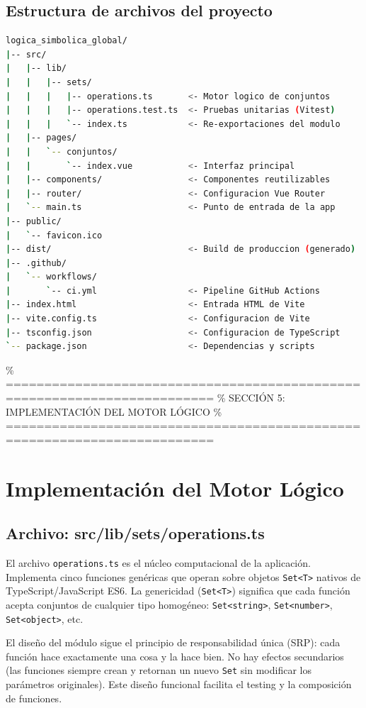 \documentclass[11pt,a4paper]{article}
\begin{document}
\subsection{Estructura de archivos del proyecto}
\begin{lstlisting}[language=bash]
logica_simbolica_global/
|-- src/
|   |-- lib/
|   |   |-- sets/
|   |   |   |-- operations.ts       <- Motor logico de conjuntos
|   |   |   |-- operations.test.ts  <- Pruebas unitarias (Vitest)
|   |   |   `-- index.ts            <- Re-exportaciones del modulo
|   |-- pages/
|   |   `-- conjuntos/
|   |       `-- index.vue           <- Interfaz principal
|   |-- components/                 <- Componentes reutilizables
|   |-- router/                     <- Configuracion Vue Router
|   `-- main.ts                     <- Punto de entrada de la app
|-- public/
|   `-- favicon.ico
|-- dist/                           <- Build de produccion (generado)
|-- .github/
|   `-- workflows/
|       `-- ci.yml                  <- Pipeline GitHub Actions
|-- index.html                      <- Entrada HTML de Vite
|-- vite.config.ts                  <- Configuracion de Vite
|-- tsconfig.json                   <- Configuracion de TypeScript
`-- package.json                    <- Dependencias y scripts
\end{lstlisting}

\newpage

\% =========================================================================
\% SECCIÓN 5: IMPLEMENTACIÓN DEL MOTOR LÓGICO
\% =========================================================================
\section{Implementación del Motor Lógico}

\subsection{Archivo: src/lib/sets/operations.ts}
El archivo \texttt{operations.ts} es el núcleo computacional de la aplicación. Implementa cinco funciones genéricas que operan sobre objetos \texttt{Set<T>} nativos de TypeScript/JavaScript ES6. La genericidad (\texttt{Set<T>}) significa que cada función acepta conjuntos de cualquier tipo homogéneo: \texttt{Set<string>}, \texttt{Set<number>}, \texttt{Set<object>}, etc.

El diseño del módulo sigue el principio de responsabilidad única (SRP): cada función hace exactamente una cosa y la hace bien. No hay efectos secundarios (las funciones siempre crean y retornan un nuevo \texttt{Set} sin modificar los parámetros originales). Este diseño funcional facilita el testing y la composición de funciones.
\end{document}
